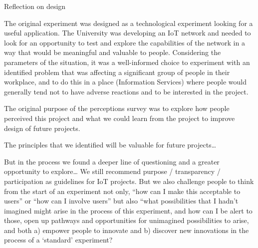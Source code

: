 Reflection on design

The original experiment was designed as a technological experiment looking for a useful application. The University was developing an IoT network and needed to look for an opportunity to test and explore the capabilities of the network in a way that would be meaningful and valuable to people. Considering the parameters of the situation, it was a well-informed choice to experiment with an identified problem that was affecting a significant group of people in their workplace, and to do this in a place (Information Services) where people would generally tend not to have adverse reactions and to be interested in the project.

The original purpose of the perceptions survey was to explore how people perceived this project and what we could learn from the project to improve design of future projects.

The principles that we identified will be valuable for future projects…

But in the process we found a deeper line of questioning and a greater opportunity to explore… We still recommend purpose / transparency / participation as guidelines for IoT projects. But we also challenge people to think from the start of an experiment not only, “how can I make this acceptable to users” or “how can I involve users” but also “what possibilities that I hadn’t imagined might arise in the process of this experiment, and how can I be alert to those, open up pathways and opportunities for unimagined possibilities to arise, and both a) empower people to innovate and b) discover new innovations in the process of a ‘standard’ experiment?
